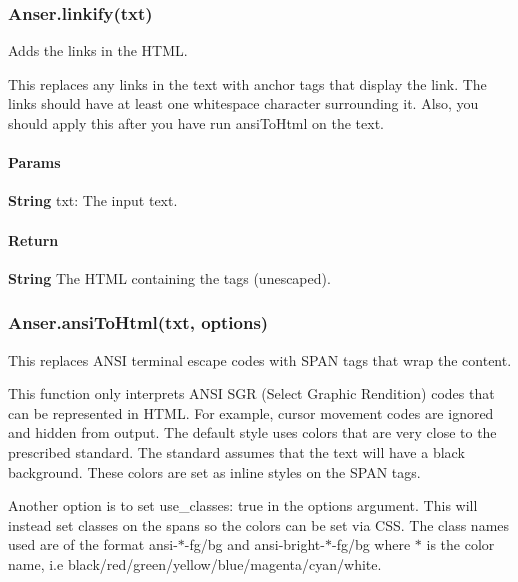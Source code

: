 \subsubsection*{{\ttfamily Anser.\+linkify(txt)}}

Adds the links in the H\+T\+ML.

This replaces any links in the text with anchor tags that display the link. The links should have at least one whitespace character surrounding it. Also, you should apply this after you have run {\ttfamily ansi\+To\+Html} on the text.

\paragraph*{Params}


\begin{DoxyItemize}
\item {\bfseries String} {\ttfamily txt}\+: The input text.
\end{DoxyItemize}

\paragraph*{Return}


\begin{DoxyItemize}
\item {\bfseries String} The H\+T\+ML containing the  tags (unescaped).
\end{DoxyItemize}

\subsubsection*{{\ttfamily Anser.\+ansi\+To\+Html(txt, options)}}

This replaces A\+N\+SI terminal escape codes with S\+P\+AN tags that wrap the content.

This function only interprets A\+N\+SI S\+GR (Select Graphic Rendition) codes that can be represented in H\+T\+ML. For example, cursor movement codes are ignored and hidden from output. The default style uses colors that are very close to the prescribed standard. The standard assumes that the text will have a black background. These colors are set as inline styles on the S\+P\+AN tags.

Another option is to set {\ttfamily use\+\_\+classes\+: true} in the options argument. This will instead set classes on the spans so the colors can be set via C\+SS. The class names used are of the format {\ttfamily ansi-\/$\ast$-\/fg/bg} and {\ttfamily ansi-\/bright-\/$\ast$-\/fg/bg} where {\ttfamily $\ast$} is the color name, i.\+e black/red/green/yellow/blue/magenta/cyan/white.

